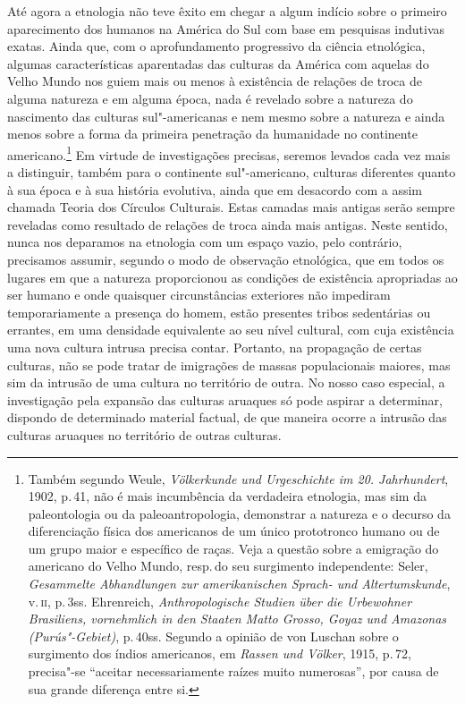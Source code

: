 Até agora a etnologia não teve êxito em chegar a algum indício sobre o
primeiro aparecimento dos humanos na América do Sul com base em
pesquisas indutivas exatas. Ainda que, com o aprofundamento progressivo
da ciência etnológica, algumas características aparentadas das culturas
da América com aquelas do Velho Mundo nos guiem mais ou menos à
existência de relações de troca de alguma natureza e em alguma época,
nada é revelado sobre a natureza do nascimento das
culturas sul"-americanas e nem mesmo sobre a natureza e ainda menos sobre
a forma da primeira penetração da humanidade no continente
americano.\footnote{Também segundo Weule, \textit{Völkerkunde und
  Urgeschichte im 20. Jahrhundert}, 1902, p.\,41, não é mais incumbência
  da verdadeira etnologia, mas sim da paleontologia ou da
  paleoantropologia, demonstrar a natureza e o decurso da diferenciação
  física dos americanos de um único prototronco
  humano ou de um grupo maior e específico de raças.
  Veja a questão sobre a emigração do americano do Velho Mundo, resp.\,do
  seu surgimento independente: Seler, \textit{Gesammelte Abhandlungen zur
  amerikanischen Sprach- und Altertumskunde}, v.\,\textsc{ii}, p.\,3ss. Ehrenreich,
  \textit{Anthropologische Studien über die Urbewohner Brasiliens,
  vornehmlich in den Staaten Matto Grosso, Goyaz und Amazonas
  (Purús"-Gebiet)}, p.\,40ss. Segundo a opinião de von Luschan
  sobre o surgimento dos índios americanos, em \textit{Rassen und Völker},
  1915, p.\,72, precisa"-se ``aceitar
  necessariamente raízes muito numerosas'', por causa de sua grande
  diferença entre si.} Em virtude de investigações precisas, seremos levados
cada vez mais a distinguir, também para o continente sul"-americano,
culturas diferentes quanto à sua época e à sua história evolutiva, ainda que em desacordo 
com a assim chamada Teoria dos Círculos
Culturais. Estas camadas mais antigas serão sempre reveladas como
resultado de relações de troca ainda mais antigas. Neste sentido, nunca nos deparamos na 
etnologia com um espaço vazio, pelo
contrário, precisamos assumir, segundo o modo de observação etnológica,
que em todos os lugares em que a natureza proporcionou as condições de
existência apropriadas ao ser humano e onde quaisquer circunstâncias
exteriores não impediram temporariamente a presença do homem, estão
presentes tribos sedentárias ou errantes, em uma densidade equivalente
ao seu nível cultural, com cuja existência uma nova cultura intrusa
precisa contar. Portanto, na propagação de certas culturas, não se pode
tratar de imigrações de massas populacionais maiores, mas sim da
intrusão de uma cultura no território de outra. No nosso caso especial,
a investigação pela expansão das culturas aruaques só pode aspirar a
determinar, dispondo de determinado material factual, de que maneira
ocorre a intrusão das culturas aruaques no território de outras
culturas.

